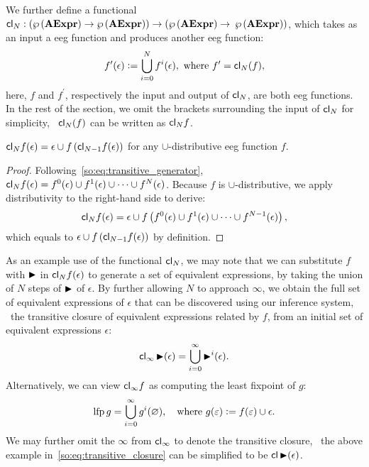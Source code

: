 \renewcommand{\closure}{\ensuremath\mathsf{cl}}

We further define a functional $\closure_N: ( \powersetof\aexprset \to
\powersetof\aexprset ) \to ( \powersetof\aexprset \to$ $\wp\left({\mathbf{AExpr}}\right)
)$, which takes as an input a \gls{eeg} function and produces another \gls{eeg}
function:
\begin{equation}
    f^\prime (\epsilon) \defeq
        \bigcup_{i = 0}^N f^i(\epsilon),
    \text{~where~} f^\prime = \closure_N (f),
    \label{so:eq:transitive_generator}
\end{equation}
here, $f$ and $f^\prime$, respectively the input and output of $\closure_N$,
are both \gls{eeg} functions.  In the rest of the section, we omit the brackets
surrounding the input of $\closure_N$ for simplicity, \eg~$\closure_N (f)$ can
be written as $\closure_N f$.

\begin{lemma}
    $\closure_N f(\epsilon) = \epsilon \cup f \left( \closure_{N-1} f(\epsilon)
    \right)$ for any $\cup$-distributive \gls{eeg} function $f$.
    {}\label{so:lem:transitive}
\end{lemma}
\begin{proof}
    Following~\eqref{so:eq:transitive_generator}, $\closure_N f(\epsilon) =
    f^0(\epsilon) \cup f^1(\epsilon) \cup \cdots \cup f^N(\epsilon)$.  Because
    $f$ is $\cup$-distributive, we apply distributivity to the right-hand side
    to derive:
    \begin{equation}
        \closure_N f(\epsilon) = \epsilon \cup f\left(
            f^0(\epsilon) \cup f^1(\epsilon) \cup \cdots \cup f^{N-1}(\epsilon)
        \right),
    \end{equation}
    which equals to $\epsilon \cup f\left( \closure_{N-1} f(\epsilon) \right)$
    by definition.
\end{proof}

As an example use of the functional $\closure_N$, we may note that we can
substitute $f$ with $\operatorname{\blacktriangleright}$ in $\closure_N f (\epsilon)$ to generate a set
of equivalent expressions, by taking the union of $N$ steps of $\operatorname{\blacktriangleright}$ of
$\epsilon$.  By further allowing $N$ to approach $\infty$, we obtain the full
set of equivalent expressions of $\epsilon$ that can be discovered using our
inference system, \ie~the transitive closure of equivalent expressions related
by $f$, from an initial set of equivalent expressions $\epsilon$:
\begin{equation}
    \closure_\infty \eqstep (\epsilon) =
        \bigcup_{i = 0}^\infty \eqstep^i(\epsilon).
    \label{so:eq:transitive_closure}
\end{equation}
Alternatively, we can view $\closure_\infty f$ as computing the
least fixpoint of $g$:
\begin{equation}
    \operatorname{\mathrm{lfp}} g = \bigcup_{i = 0}^\infty g^i(\varnothing),
    \quad \text{where~} g(\varepsilon) \vcentcolon= f(\varepsilon) \cup \epsilon.
\end{equation}
We may further omit the $\infty$ from $\closure_\infty$ to denote the
transitive closure, \eg~the above example in~\eqref{so:eq:transitive_closure}
can be simplified to be $\closure \eqstep (\epsilon)$.

